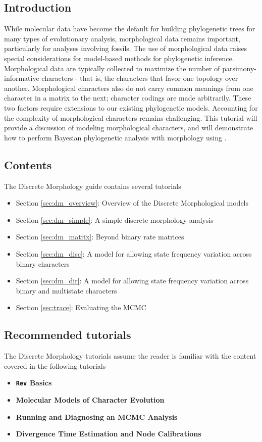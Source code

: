 \subsection*{Introduction}

While molecular data have become the default for building phylogenetic trees for many types of evolutionary analysis, morphological data remains important, particularly for analyses involving fossils. The use of morphological data  raises special considerations for model-based methods for phylogenetic inference. Morphological data are typically collected to maximize the number of parsimony-informative characters -  that is, the characters that favor one topology over another.  Morphological characters also do not carry common meanings from one character in a matrix to the next; character codings are made arbitrarily. These two factors require extensions to our existing phylogenetic models. Accounting for the complexity of morphological characters remains challenging. This tutorial will provide a discussion of modeling morphological characters, and will demonstrate how to perform Bayesian phylogenetic analysis with morphology using . 

\subsection*{Contents}

The Discrete Morphology guide contains several tutorials

\begin{itemize}
\item Section \ref{sec:dm_overview}: Overview of the Discrete Morphological models
\item Section \ref{sec:dm_simple}: A simple discrete morphology analysis
\item Section \ref{sec:dm_matrix}: Beyond binary rate matrices
\item Section \ref{sec:dm_disc}: A model for allowing state frequency variation across binary characters
\item Section \ref{sec:dm_dir}: A model for allowing state frequency variation across binary and multistate characters
\item Section \ref{sec:trace}: Evaluating the MCMC \end{itemize}

\subsection*{Recommended tutorials}

The Discrete Morphology tutorials assume the reader is familiar with the content covered in the following \RevBayes tutorials

\begin{itemize}
\item {\bf {\tt \large Rev} Basics}
\item {\bf Molecular Models of Character Evolution}
\item {\bf Running and Diagnosing an MCMC Analysis}
\item {\bf Divergence Time Estimation and Node Calibrations}
\end{itemize}

\newpage

